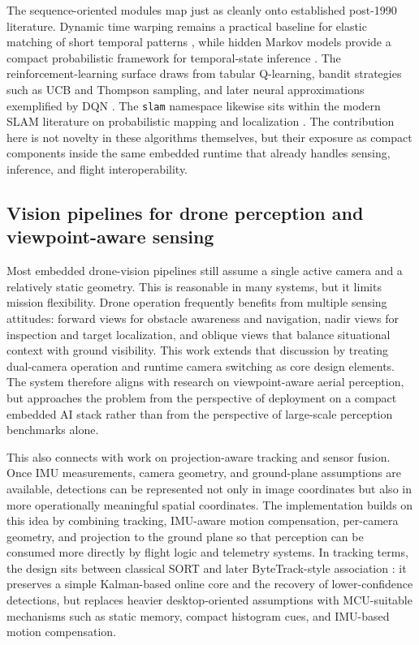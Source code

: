 The sequence-oriented modules map just as cleanly onto established
post-1990 literature. Dynamic time warping remains a practical baseline
for elastic matching of short temporal patterns \citep{Salvador2007},
while hidden Markov models provide a compact probabilistic framework for
temporal-state inference \citep{Bilmes1998}. The reinforcement-learning
surface draws from tabular Q-learning, bandit strategies such as UCB and
Thompson sampling, and later neural approximations exemplified by DQN
\citep{Watkins1992, Auer2002, Russo2018, Mnih2015}. The \texttt{slam}
namespace likewise sits within the modern SLAM literature on
probabilistic mapping and localization
\citep{DurrantWhyte2006, Cadena2016}. The contribution here is not
novelty in these algorithms themselves, but their exposure as compact
components inside the same embedded runtime that already handles
sensing, inference, and flight interoperability.

\subsection{Vision pipelines for drone perception and viewpoint-aware
sensing}\label{vision-pipelines-for-drone-perception-and-viewpoint-aware-sensing}

Most embedded drone-vision pipelines still assume a single active camera
and a relatively static geometry. This is reasonable in many systems,
but it limits mission flexibility. Drone operation frequently benefits
from multiple sensing attitudes: forward views for obstacle awareness
and navigation, nadir views for inspection and target localization, and
oblique views that balance situational context with ground visibility.
This work extends that discussion by treating dual-camera operation and
runtime camera switching as core design elements. The system therefore
aligns with research on viewpoint-aware aerial perception, but
approaches the problem from the perspective of deployment on a compact
embedded AI stack rather than from the perspective of large-scale
perception benchmarks alone.

This also connects with work on projection-aware tracking and sensor
fusion. Once IMU measurements, camera geometry, and ground-plane
assumptions are available, detections can be represented not only in
image coordinates but also in more operationally meaningful spatial
coordinates. The implementation builds on this idea by combining
tracking, IMU-aware motion compensation, per-camera geometry, and
projection to the ground plane so that perception can be consumed more
directly by flight logic and telemetry systems. In tracking terms, the
design sits between classical SORT \citep{Bewley2016} and later
ByteTrack-style association \citep{Zhang2022}: it preserves a simple
Kalman-based online core and the recovery of lower-confidence
detections, but replaces heavier desktop-oriented assumptions with
MCU-suitable mechanisms such as static memory, compact histogram cues,
and IMU-based motion compensation.

